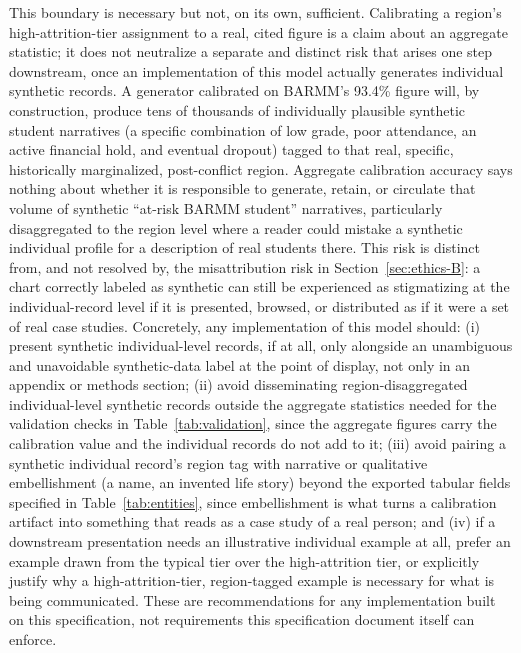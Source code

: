 \documentclass[11pt]{article}
\begin{document}
This boundary is necessary but not, on its own, sufficient. Calibrating a region's high-attrition-tier assignment to a real, cited figure is a claim about an aggregate statistic; it does not neutralize a separate and distinct risk that arises one step downstream, once an implementation of this model actually generates individual synthetic records. A generator calibrated on BARMM's 93.4\% figure will, by construction, produce tens of thousands of individually plausible synthetic student narratives (a specific combination of low grade, poor attendance, an active financial hold, and eventual dropout) tagged to that real, specific, historically marginalized, post-conflict region. Aggregate calibration accuracy says nothing about whether it is responsible to generate, retain, or circulate that volume of synthetic ``at-risk BARMM student'' narratives, particularly disaggregated to the region level where a reader could mistake a synthetic individual profile for a description of real students there. This risk is distinct from, and not resolved by, the misattribution risk in Section~\ref{sec:ethics-B}: a chart correctly labeled as synthetic can still be experienced as stigmatizing at the individual-record level if it is presented, browsed, or distributed as if it were a set of real case studies. Concretely, any implementation of this model should: (i) present synthetic individual-level records, if at all, only alongside an unambiguous and unavoidable synthetic-data label at the point of display, not only in an appendix or methods section; (ii) avoid disseminating region-disaggregated individual-level synthetic records outside the aggregate statistics needed for the validation checks in Table~\ref{tab:validation}, since the aggregate figures carry the calibration value and the individual records do not add to it; (iii) avoid pairing a synthetic individual record's region tag with narrative or qualitative embellishment (a name, an invented life story) beyond the exported tabular fields specified in Table~\ref{tab:entities}, since embellishment is what turns a calibration artifact into something that reads as a case study of a real person; and (iv) if a downstream presentation needs an illustrative individual example at all, prefer an example drawn from the typical tier over the high-attrition tier, or explicitly justify why a high-attrition-tier, region-tagged example is necessary for what is being communicated. These are recommendations for any implementation built on this specification, not requirements this specification document itself can enforce.
\end{document}
